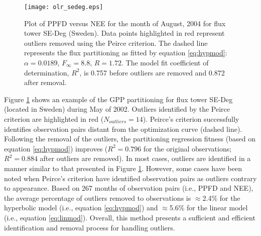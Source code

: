 \begin{figure}[h!]
    \texttt{[image: olr\_sedeg.eps]}
    \caption{Plot of PPFD versus NEE for the month of August, 2004 for flux 
    tower SE-Deg (Sweden). Data points highlighted in red represent outliers 
    removed using the Peirce criterion. The dashed line represents the flux 
    partitioning as fitted by equation \ref{eq:hypmod}: $\alpha = 0.0189$, 
    $F_{\infty} = 8.8$, $R = 1.72$. The model fit coefficient of determination, 
    $R^{2}$, is 0.757 before outliers are removed and 0.872 after removal.}
    \label{fig:outlier}
\end{figure}

\noindent Figure \ref{fig:outlier} shows an example of the GPP partitioning for flux tower SE-Deg (located in Sweden) during May of 2002.  
Outliers identified by the Peirce criterion are highlighted in red ($N_{outliers} = 14$).  
Peirce's criterion successfully identifies observation pairs distant from the optimization curve (dashed line).  
Following the removal of the outliers, the partitioning regression fitness (based on equation \ref{eq:hypmod}) improves ($R^{2} = 0.796$ for the original observations; $R^{2} = 0.884$ after outliers are removed).  
In most cases, outliers are identified in a manner similar to that presented in Figure \ref{fig:outlier}.  
However, some cases have been noted when Peirce's criterion have identified observation pairs as outliers contrary to appearance.  
Based on 267 months of observation pairs (i.e., PPFD and NEE), the average percentage of outliers removed to observations is $\approx$2.4\% for the hyperbolic model (i.e., equation \ref{eq:hypmod}) and $\approx$5.6\% for the linear model (i.e., equation \ref{eq:linmod}).  
Overall, this method presents a sufficient and efficient identification and removal process for handling outliers. 
